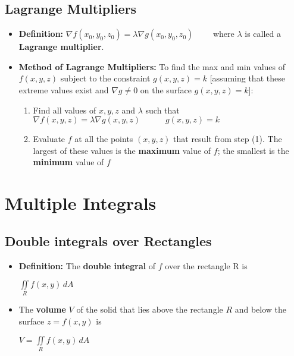 \documentclass{report}
\begin{document}
	\section{Lagrange Multipliers}
		\begin{itemize}\addtolength{\leftskip}{2em}
			\item \textbf{Definition: }$\nabla f(x_0,y_0,z_0) = \lambda \nabla g(x_0,y_0,z_0)\quad\quad$ where $\lambda$ is called a \textbf{Lagrange multiplier}.
			\item \textbf{Method of Lagrange Multipliers:} To find the max and min values of $f(x,y,z)$ subject to the constraint $g(x,y,z)=k$ [assuming that these extreme values exist and $\nabla g\ne 0$ on the surface $g(x,y,z)=k$]:
			\begin{enumerate}\addtolength{\leftskip}{4em}
				\item Find all values of $x,y,z$ and $\lambda$ such that 
				\subsubitem$\nabla f(x,y,z)=\lambda \nabla g(x,y,z)\quad\quad\quad g(x,y,z)=k$
				\item Evaluate $f$ at all the points $(x,y,z)$ that result from step (1). The largest of these values is the \textbf{maximum} value of $f$; the smallest is the \textbf{minimum} value of $f$
			\end{enumerate} 
		\end{itemize}
\chapter{Multiple Integrals}
	\section{Double integrals over Rectangles}
		\begin{itemize}\addtolength{\leftskip}{2em}
			\item \textbf{Definition:} The \textbf{double integral} of $f$ over the rectangle R is 
			\begin{center}
			$\iint\limits_{R} f(x,y)\,dA$ 
			\end{center}
			\item The \textbf{volume} $V$ of the solid that lies above the rectangle $R$ and below the surface $z=f(x,y)$ is 
			\begin{center}
				$V=\iint\limits_{R}f(x,y)\,dA$
			\end{center}
		\end{itemize}
\end{document}
